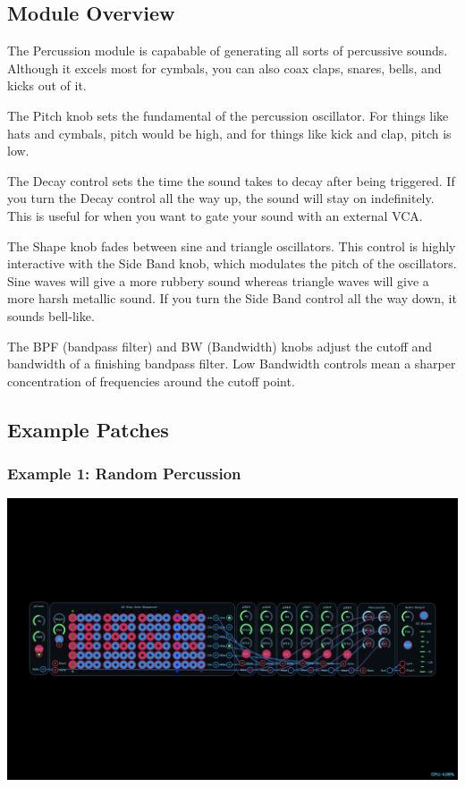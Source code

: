 \documentclass[11pt]{book}
\begin{document}
\pagebreak

\begin{multicols*}{2}

\subsection*{Module Overview}

The Percussion module is capabable of generating all sorts of percussive sounds. Although it excels most for cymbals, you can also coax claps, snares, bells, and kicks out of it.

The Pitch knob sets the fundamental of the percussion oscillator. For things like hats and cymbals, pitch would be high, and for things like kick and clap, pitch is low.

The Decay control sets the time the sound takes to decay after being triggered. If you turn the Decay control all the way up, the sound will stay on indefinitely. This is useful for when you want to gate your sound with an external VCA.

The Shape knob fades between sine and triangle oscillators. This control is highly interactive with the Side Band knob, which modulates the pitch of the oscillators. Sine waves will give a more rubbery sound whereas triangle waves will give a more harsh metallic sound. If you turn the Side Band control all the way down, it sounds bell-like.

The BPF (bandpass filter) and BW (Bandwidth) knobs adjust the cutoff and bandwidth of a finishing bandpass filter. Low Bandwidth controls mean a sharper concentration of frequencies around the cutoff point.

\subsection*{Example Patches}

\subsubsection*{Example 1: Random Percussion}

\begin{center}
\includegraphics[width=0.95\linewidth]{percussion-fig1.png}
\end{center}


\end{multicols*}
\end{document}
